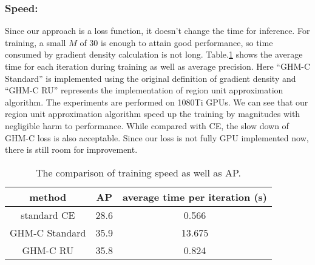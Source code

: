 \documentclass[letterpaper]{article} \usepackage{aaai19}  \usepackage{times}  \usepackage{helvet}  \usepackage{courier}  \usepackage{url}  \usepackage{graphicx}  \usepackage{amsmath,amssymb}
\begin{document}
\subsubsection{Speed:} Since our approach is a loss function, it doesn't change the time for inference. For training, a small $M$ of 30 is enough to attain good performance, so time consumed by gradient density calculation is not long. Table.\ref{tab:speed} shows the average time for each iteration during training as well as average precision. Here ``GHM-C Standard'' is implemented using the original definition of gradient density and ``GHM-C RU'' represents the implementation of region unit approximation algorithm. The experiments are performed on 1080Ti GPUs. We can see that our region unit approximation algorithm speed up the training by magnitudes with negligible harm to performance. While compared with CE, the slow down of  GHM-C loss is also acceptable. Since our loss is not fully GPU implemented now, there is still room for improvement.
\begin{table}[!ht]
\begin{center}
\begin{tabular}{| c | c | c |}
\hline
method & AP & average time per iteration (s) \\
\hline
standard CE & 28.6 & 0.566 \\
GHM-C Standard & 35.9 & 13.675 \\
GHM-C RU & 35.8 & 0.824 \\
\hline 
\end{tabular}
\caption{The comparison of training speed as well as AP.}
\label{tab:speed}
\end{center}
\end{table}
\end{document}
